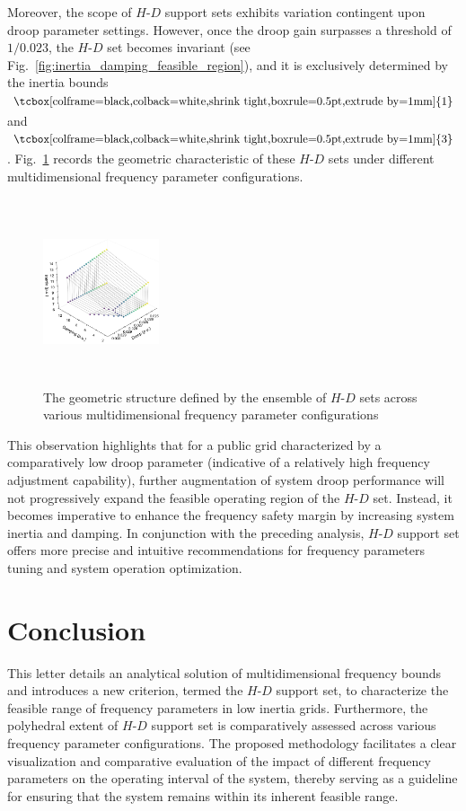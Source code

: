 \documentclass[lettersize,journal]{IEEEtran}
\newcommand{\ciao}[1]{{\setlength\fboxrule{0pt}\fbox{\tcbox[colframe=black,colback=white,shrink tight,boxrule=0.5pt,extrude by=1mm]{\small #1}}}}
\begin{document}
Moreover, the scope of $H$-$D$ support sets exhibits variation contingent upon droop parameter settings. However, once the droop gain surpasses a threshold of $1/0.023$, the $H$-$D$ set becomes invariant (see Fig.~\ref{fig:inertia_damping_feasible_region}), and it is exclusively determined by the inertia bounds $\ciao{1}$ and $\ciao{3}$. Fig.~\ref{fig:diff_inertia_damping_supportset} records the geometric characteristic of these $H$-$D$ sets under different multidimensional frequency parameter configurations.

\begin{figure}[!t]
	\centering
	\includegraphics[width=0.305\textwidth,height = 5.5cm]{diff_inertia_damping_supportset.pdf}\vspace{-0.25cm}
	\caption{The geometric structure defined by the ensemble of $H$-$D$ sets across various multidimensional frequency parameter configurations}\vspace{-0.25cm}
	\label{fig:diff_inertia_damping_supportset}
\end{figure}


This observation highlights that for a public grid characterized by a comparatively low droop parameter (indicative of a relatively high frequency adjustment capability), further augmentation of system droop performance will not progressively expand the feasible operating region of the $H$-$D$ set. Instead, it becomes imperative to enhance the frequency safety margin by increasing system inertia and damping. In conjunction with the preceding analysis, $H$-$D$ support set offers more precise and intuitive recommendations for frequency parameters tuning and system operation optimization.


\section{Conclusion}

This letter details an analytical solution of multidimensional frequency bounds and introduces a new criterion, termed the $H$-$D$ support set, to characterize the feasible range of frequency parameters in low inertia grids. Furthermore, the polyhedral extent of $H$-$D$ support set is comparatively assessed across various frequency parameter configurations. The proposed methodology facilitates a clear visualization and comparative evaluation of the impact of different frequency parameters on the operating interval of the system, thereby serving as a guideline for ensuring that the system remains within its inherent feasible range.



\end{document}
